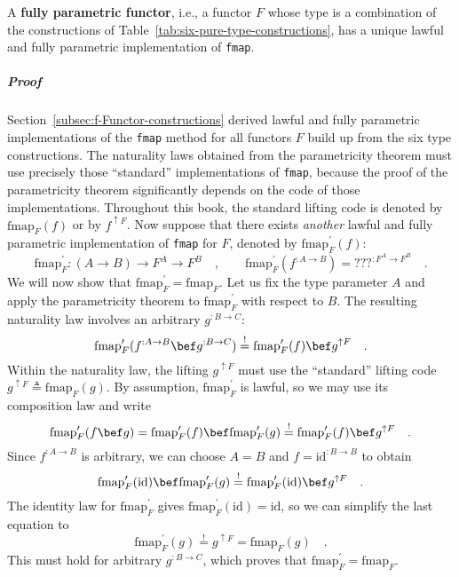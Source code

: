 A \textbf{fully parametric functor},
i.e., a functor $F$ whose type is a combination of the constructions
of Table~\ref{tab:six-pure-type-constructions}, has a unique lawful
and fully parametric implementation of \lstinline!fmap!. 

\subparagraph{Proof}

Section~\ref{subsec:f-Functor-constructions} derived lawful and
fully parametric implementations of the \lstinline!fmap! method for
all functors $F$ build up from the six type constructions. The naturality
laws obtained from the parametricity theorem must use precisely those
\textsf{``}standard\textsf{''} implementations of \lstinline!fmap!, because the proof
of the parametricity theorem significantly depends on the code of
those implementations. Throughout this book, the standard lifting
code is denoted by $\text{fmap}_{F}(f)$ or by $f^{\uparrow F}$.
Now suppose that there exists \emph{another} lawful and fully parametric
implementation of \lstinline!fmap! for $F$, denoted by $\text{fmap}_{F}^{\prime}(f)$:
\[
\text{fmap}_{F}^{\prime}:\left(A\rightarrow B\right)\rightarrow F^{A}\rightarrow F^{B}\quad,\quad\quad\text{fmap}_{F}^{\prime}(f^{:A\rightarrow B})=\text{???}^{:F^{A}\rightarrow F^{B}}\quad.
\]
We will now show that $\text{fmap}_{F}^{\prime}=\text{fmap}_{F}$.
Let us fix the type parameter $A$ and apply the parametricity theorem
to $\text{fmap}_{F}^{\prime}$ with respect to $B$. The resulting
naturality law involves an arbitrary $g^{:B\rightarrow C}$:
\[
\text{fmap}_{F}^{\prime}(f^{:A\rightarrow B}\bef g^{:B\rightarrow C})\overset{!}{=}\text{fmap}_{F}^{\prime}(f)\bef g^{\uparrow F}\quad.
\]
Within the naturality law, the lifting $g^{\uparrow F}$ must use
the \textsf{``}standard\textsf{''} lifting code $g^{\uparrow F}\triangleq\text{fmap}_{F}(g)$.
By assumption, $\text{fmap}_{F}^{\prime}$ is lawful, so we may use
its composition law and write
\[
\text{fmap}_{F}^{\prime}(f\bef g)=\text{fmap}_{F}^{\prime}(f)\bef\text{fmap}_{F}^{\prime}(g)\overset{!}{=}\text{fmap}_{F}^{\prime}(f)\bef g^{\uparrow F}\quad.
\]
Since $f^{:A\rightarrow B}$ is arbitrary, we can choose $A=B$ and
$f=\text{id}^{:B\rightarrow B}$ to obtain
\[
\text{fmap}_{F}^{\prime}(\text{id})\bef\text{fmap}_{F}^{\prime}(g)\overset{!}{=}\text{fmap}_{F}^{\prime}(\text{id})\bef g^{\uparrow F}\quad.
\]
The identity law for $\text{fmap}_{F}^{\prime}$ gives $\text{fmap}_{F}^{\prime}(\text{id})=\text{id}$,
so we can simplify the last equation to
\[
\text{fmap}_{F}^{\prime}(g)\overset{!}{=}g^{\uparrow F}=\text{fmap}_{F}(g)\quad.
\]
This must hold for arbitrary $g^{:B\rightarrow C}$, which proves
that $\text{fmap}_{F}^{\prime}=\text{fmap}_{F}$.

